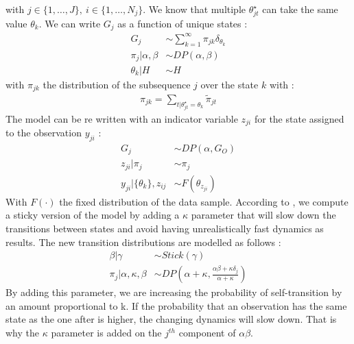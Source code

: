 with $j\in \{1,\dots, J\},\ i\in \{ 1,\dots, N_j\}$. We know that multiple $\theta^\star_{jt}$ can take the same value $\theta_k$. We can write $G_j$ as a function of unique states :
\begin{align*}
	G_j &\sim \sum^\infty_{k=1} \pi_{jk} \delta_{\theta_k} \\
	\pi_j|\alpha, \beta  &\sim DP(\alpha, \beta) \\
	\theta_k |H &\sim H
\end{align*}
with $\pi_{jk}$ the distribution of the subsequence $j$ over the state $k$ with : 
\begin{align*}
	\pi_{jk} = \sum_{t|\theta^\star_{jt}= \theta_k} \tilde{\pi}_{jt}
\end{align*}
The model can be re written with an indicator variable $z_{ji}$ for the state assigned to the observation $y_{ji}$ : 
\begin{align*}
	G_j &\sim DP(\alpha, G_O) \\
	z_{ji}|\pi_j &\sim \pi_j \\
	y_{ji}| \{\theta_k\}, z_{ij} &\sim F(\theta_{z_{ji}})
\end{align*}
With $F(\cdot)$ the fixed distribution of the data sample. According to \cite{fox_sticky_2011}, we compute a sticky version of the model by adding a $\kappa$ parameter that will slow down the transitions between states and avoid having unrealistically fast dynamics as results. The new transition distributions are modelled as follows : 
\begin{align*}
	\beta|\gamma &\sim Stick(\gamma) \\
	\pi_j| \alpha, \kappa, \beta  &\sim DP\left(\alpha + \kappa, \frac{\alpha\beta + \kappa \delta_j}{\alpha + \kappa} \right) 
\end{align*}
By adding this parameter, we are increasing the probability of self-transition by an amount proportional to k. If the probability that an observation has the same state as the one after is higher, the changing dynamics will slow down. That is why the $\kappa$ parameter is added on the $j^{th}$ component of $\alpha\beta$. 

